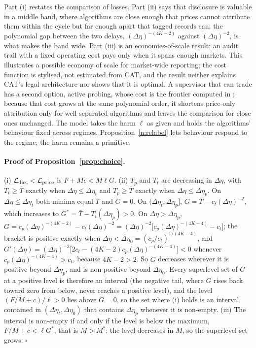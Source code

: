 \documentclass[12pt]{article}
\theoremstyle{definition}
\theoremstyle{remark}
\begin{document}
Part (i) restates the comparison of losses. Part (ii) says that disclosure is valuable in a middle band, where algorithms are close enough that prices cannot attribute them within the cycle but far enough apart that tagged records can; the polynomial gap between the two delays, $(\Delta\eta)^{-(4K-2)}$ against $(\Delta\eta)^{-2}$, is what makes the band wide. Part (iii) is an economies-of-scale result: an audit trail with a fixed operating cost pays only when it spans enough markets. This illustrates a possible economy of scale for market-wide reporting; the cost function is stylised, not estimated from CAT, and the result neither explains CAT's legal architecture nor shows that it is optimal. A supervisor that can trade has a second option, active probing, whose cost is the frontier computed in \citet{niroula2026a}; because that cost grows at the same polynomial order, it shortens price-only attribution only for well-separated algorithms and leaves the comparison for close ones unchanged. The model takes the harm $\ell$ as given and holds the algorithms' behaviour fixed across regimes. Proposition~\ref{n:relabel} lets behaviour respond to the regime; the harm remains a primitive.

\paragraph{Proof of Proposition~\ref{prop:choice}.}
 (i) $\mathcal L_{\rm disc}<\mathcal L_{\rm price}$ is $F+Mc<M\ell G$. (ii) $T_p$ and $T_t$ are decreasing in $\Delta\eta$, with $T_t\ge\bar T$ exactly when $\Delta\eta\le\Delta\eta_t$ and $T_p\ge\bar T$ exactly when $\Delta\eta\le\Delta\eta_p$. On $\Delta\eta\le\Delta\eta_t$ both minima equal $\bar T$ and $G=0$. On $(\Delta\eta_t,\Delta\eta_p]$, $G=\bar T-c_t(\Delta\eta)^{-2}$, which increases to $G^*=\bar T-T_t(\Delta\eta_p)>0$. On $\Delta\eta>\Delta\eta_p$, $G=c_p(\Delta\eta)^{-(4K-2)}-c_t(\Delta\eta)^{-2}=(\Delta\eta)^{-2}\bigl[c_p(\Delta\eta)^{-(4K-4)}-c_t\bigr]$; the bracket is positive exactly when $\Delta\eta<\Delta\eta_0=(c_p/c_t)^{1/(4K-4)}$, and $G'(\Delta\eta)=(\Delta\eta)^{-3}\bigl[2c_t-(4K-2)c_p(\Delta\eta)^{-(4K-4)}\bigr]<0$ whenever $c_p(\Delta\eta)^{-(4K-4)}>c_t$, because $4K-2>2$. So $G$ decreases wherever it is positive beyond $\Delta\eta_p$, and is non-positive beyond $\Delta\eta_0$. Every superlevel set of $G$ at a positive level is therefore an interval (the negative tail, where $G$ rises back toward zero from below, never reaches a positive level), and the level $(F/M+c)/\ell>0$ lies above $G=0$, so the set where (i) holds is an interval contained in $(\Delta\eta_t,\Delta\eta_0)$ that contains $\Delta\eta_p$ whenever it is non-empty. (iii) The interval is non-empty if and only if the level is below the maximum, $F/M+c<\ell G^*$, that is $M>M^*$; the level decreases in $M$, so the superlevel set grows. $\square$
\end{document}

